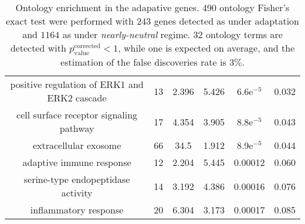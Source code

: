 \documentclass{article}
\begin{document}
\begin{table*}[h!]
\begin{adjustbox}{width = 1\textwidth}
\begin{tabular}{|c|c|c|c|c|c|}
			positive regulation of ERK1 and ERK2 cascade & 13 & 2.396 & 5.426 & 6.6e$^{-5}$ & 0.032 \\
			cell surface receptor signaling pathway & 17 & 4.354 & 3.905 & 8.8e$^{-5}$ & 0.043 \\
			extracellular exosome & 66 & 34.5 & 1.912 & 8.9e$^{-5}$ & 0.044 \\
			adaptive immune response & 12 & 2.204 & 5.445 & 0.00012 & 0.060 \\
			serine-type endopeptidase activity & 14 & 3.192 & 4.386 & 0.00016 & 0.076 \\
			inflammatory response & 20 & 6.304 & 3.173 & 0.00017 & 0.085 \\
			\hline
		\end{tabular}
	\end{adjustbox}
	\label{table:ontology}
	\caption{
		Ontology enrichment in the adapative genes.
		490 ontology Fisher's exact test were performed with $243$ genes detected as under adaptation and $1164$ as under \textit{nearly-neutral} regime.
		$32$ ontology terms are detected with $p_{\mathrm{value}}^{\mathrm{corrected}} < 1$, while one is expected on average, and the estimation of the false discoveries rate is $3\%$.
	}
\end{table*}
\end{document}
